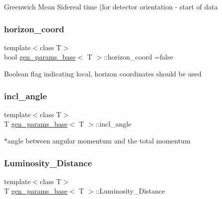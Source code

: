 Greenwich Mean Sidereal time (for detector orientation -\/ start of data \mbox{\label{classgen__params__base_a75a9201e603d8d7e348a8ae914b03ee9}} 
\subsubsection{\texorpdfstring{horizon\+\_\+coord}{horizon\_coord}}
{\footnotesize\ttfamily template$<$class T$>$ \\
bool \hyperlink{classgen__params__base}{gen\+\_\+params\+\_\+base}$<$ T $>$\+::horizon\+\_\+coord =false}

Boolean flag indicating local, horizon coordinates should be used \mbox{\label{classgen__params__base_af55fdc0245e65234b570f5c9918bd88b}} 
\subsubsection{\texorpdfstring{incl\+\_\+angle}{incl\_angle}}
{\footnotesize\ttfamily template$<$class T$>$ \\
T \hyperlink{classgen__params__base}{gen\+\_\+params\+\_\+base}$<$ T $>$\+::incl\+\_\+angle}

$\ast$angle between angular momentum and the total momentum \mbox{\label{classgen__params__base_ad1fe02f4ddabb07ba1cf42ec7e31d659}} 
\subsubsection{\texorpdfstring{Luminosity\+\_\+\+Distance}{Luminosity\_Distance}}
{\footnotesize\ttfamily template$<$class T$>$ \\
T \hyperlink{classgen__params__base}{gen\+\_\+params\+\_\+base}$<$ T $>$\+::Luminosity\+\_\+\+Distance}


